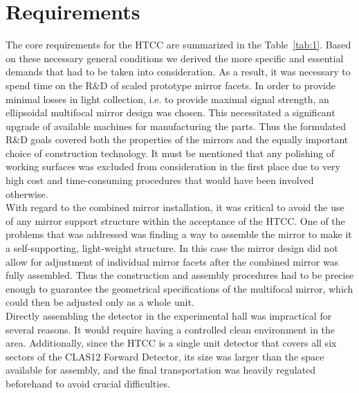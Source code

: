 \section{Requirements}

The core requirements for the HTCC are summarized in the Table~\ref{tab:1}. Based on these necessary general
conditions we derived the more specific and essential demands that had to be taken into consideration. As a result,
it was necessary to spend time on the R$\&$D of scaled prototype mirror facets. In order to provide minimal losses
in light collection, i.e. to provide maximal signal strength, an ellipsoidal multifocal mirror design was chosen. This
necessitated a significant upgrade of available machines for manufacturing the parts. Thus the formulated R$\&$D
goals covered both the properties of the mirrors and the equally important choice of construction technology. It must
be mentioned that any polishing of working surfaces was excluded from consideration in the first place due to very
high cost and time-consuming procedures that would have been involved otherwise. \\
\indent With regard to the combined mirror installation, it was critical to avoid the use of any mirror support
structure within the acceptance of the HTCC. One of the problems that was addressed was finding a way to assemble
the mirror to make it a self-supporting, light-weight structure. In this case the mirror design did not allow for
adjustment of individual mirror facets after the combined mirror was fully assembled. Thus the construction and
assembly procedures had to be precise enough to guarantee the geometrical specifications of the multifocal mirror,
which could then be adjusted only as a whole unit. \\
\indent Directly assembling the detector in the experimental hall was impractical for several reasons. It would require
having a controlled clean environment in the area. Additionally, since the HTCC is a single unit detector that covers all
six sectors of the CLAS12 Forward Detector, its size was larger than the space available for assembly, and the final
transportation was heavily regulated beforehand to avoid crucial difficulties. 
 
